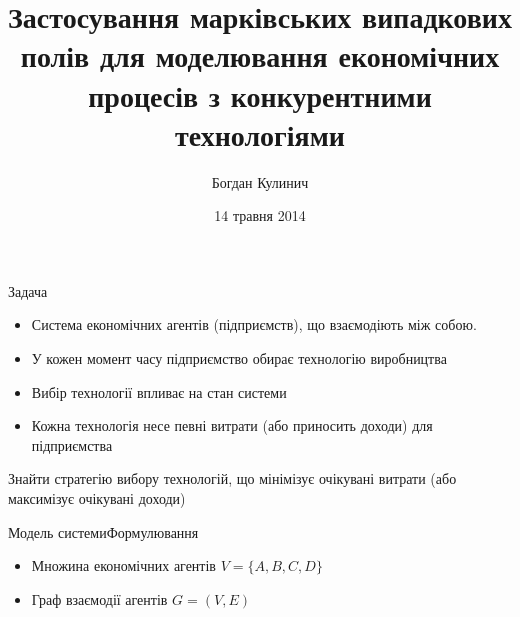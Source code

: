 \documentclass[pdf]{beamer}
\title{Застосування марківських випадкових полів для моделювання економічних процесів з конкурентними технологіями}
\date[2014]{14 травня 2014}
\author{Богдан Кулинич}
\begin{document}
\begin{frame}
\titlepage
\end{frame}


\begin{frame}{Задача}

\begin{itemize}
\item Система економічних агентів (підприємств), що взаємодіють між собою.
\item У кожен момент часу підприємство обирає технологію виробництва
\item Вибір технології впливає на стан системи
\item Кожна технологія несе певні витрати (або приносить доходи) для підприємства
\end{itemize}

\begin{block}{ }
Знайти стратегію вибору технологій, що мінімізує очікувані витрати (або максимізує очікувані доходи)
\end{block}
	
\end{frame}


\begin{frame}{Модель системи}{Формулювання}
	
	\begin{center}
	\end{center}
	
	\begin{itemize}
	\item Множина економічних агентів \(V = \{A, B, C, D\}\)
	\item Граф взаємодії агентів \(G = (V, E)\)
	\end{itemize}
	
\end{frame}
\end{document}
